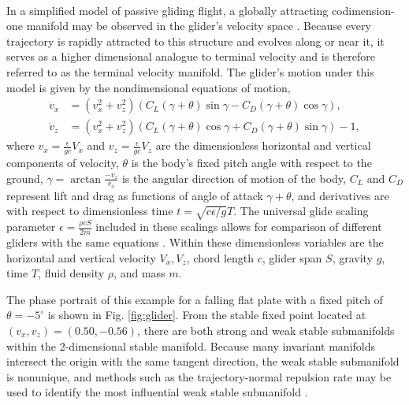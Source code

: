 \documentclass[twocolumn]{svjour3}
\newcommand{\edit}[3]{{\color{red} #2}}
\begin{document}
 \\
In a simplified model of passive gliding flight, a globally attracting codimension-one manifold may be observed in the glider's velocity space \cite{nave2018global,yeaton_global_2017}. Because every trajectory is rapidly attracted to this structure and evolves along or near it, it serves as a higher dimensional analogue to terminal velocity and is therefore referred to as the terminal velocity manifold. The glider's motion under this model is given by the nondimensional equations of motion,
\edit{}{\begin{equation}
\begin{aligned}
\dot{v}_x &= \left(v_x^2+v_z^2\right)\left(C_L\left(\gamma+\theta\right)\sin\gamma - C_D\left(\gamma+\theta\right)\cos\gamma\right), \\
\dot{v}_z &= \left(v_x^2+v_z^2\right)\left(C_L\left(\gamma+\theta\right)\cos\gamma + C_D\left(\gamma+\theta\right)\sin\gamma\right) - 1,
\end{aligned}
\label{eq:glider}
\end{equation}}{21}
where $v_x=\tfrac{\epsilon}{gc}V_x$ and $v_z=\tfrac{\epsilon}{gc}V_z$ are the dimensionless horizontal and vertical components of velocity, $\theta$ is the body's fixed pitch angle with respect to the ground, $\gamma=\arctan\tfrac{-v_z}{v_x}$ is the angular direction of motion of the body, $C_L$ and $C_D$ represent lift and drag as functions of angle of attack $\gamma+\theta$, and derivatives are with respect to dimensionless time $t=\sqrt{c\epsilon/g}T$. The universal glide scaling parameter $\epsilon=\tfrac{\rho c S}{2m}$ included in these scalings allows for comparison of different gliders with the same equations \cite{yeaton_global_2017}. Within these dimensionless variables are the horizontal and vertical velocity $V_x,V_z$, chord length $c$, glider span $S$, gravity $g$, time $T$, fluid density $\rho$, and mass $m$.

The phase portrait of this example for a falling flat plate with a fixed pitch of $\theta=-5^\circ$ is shown in Fig. \ref{fig:glider}. From the stable fixed point located at $(v_x,v_z)=(0.50, -0.56)$, there are both strong and weak stable submanifolds within the \edit{}{2-dimensional stable manifold}{22}. Because many invariant manifolds intersect the origin with the same tangent direction, the weak stable submanifold is nonunique, and methods such as the trajectory-normal repulsion rate may be used to identify the most influential weak stable submanifold \cite{haller_variational_2011,nave2018global}.
\end{document}
